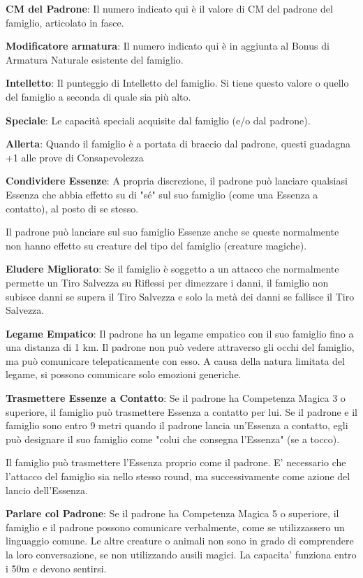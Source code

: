 \documentclass[a4paper,11pt,twoside,openany]{book}
\begin{document}
\bigskip

\textbf{CM del Padrone}: Il numero indicato qui è il valore di CM del padrone del famiglio, articolato in fasce.

\textbf{Modificatore armatura}: Il numero indicato qui è in aggiunta al Bonus di Armatura Naturale esistente del famiglio.

\textbf{Intelletto}: Il punteggio di Intelletto del famiglio. Si tiene questo valore o quello del famiglio a seconda di quale sia più alto.

\textbf{Speciale}: Le capacità speciali acquisite dal famiglio (e/o dal padrone).

\textbf{Allerta}: Quando il famiglio è a portata di braccio dal padrone, questi guadagna +1 alle prove di Consapevolezza

\textbf{Condividere Essenze}: A propria discrezione, il padrone può lanciare qualsiasi Essenza che abbia effetto su di "sé" sul suo famiglio (come una Essenza a contatto), al posto di se stesso.

Il padrone può lanciare sul suo famiglio Essenze anche se queste normalmente non hanno effetto su creature del tipo del famiglio (creature magiche).

\textbf{Eludere Migliorato}: Se il famiglio è soggetto a un attacco che normalmente permette un Tiro Salvezza su Riflessi per dimezzare i danni, il famiglio non subisce danni se supera il Tiro Salvezza e solo la metà dei danni se fallisce il Tiro Salvezza.

\textbf{Legame Empatico}: Il padrone ha un legame empatico con il suo famiglio fino a una distanza di 1 km. Il padrone non può vedere attraverso gli occhi del famiglio, ma può comunicare telepaticamente con esso. A causa della natura limitata del legame, si possono comunicare solo emozioni generiche.

\textbf{Trasmettere Essenze a Contatto}: Se il padrone ha Competenza Magica 3 o superiore, il famiglio può trasmettere Essenza a contatto per lui. Se il padrone e il famiglio sono entro 9 metri quando il padrone lancia un'Essenza a contatto, egli può designare il suo famiglio come "colui che consegna l'Essenza" (se a tocco).

Il famiglio può trasmettere l'Essenza proprio come il padrone. E' necessario che l'attacco del famiglio sia nello stesso round, ma successivamente come azione del lancio dell'Essenza.

\textbf{Parlare col Padrone}: Se il padrone ha Competenza Magica 5 o superiore, il famiglio e il padrone possono comunicare verbalmente, come se utilizzassero un linguaggio comune. Le altre creature o animali non sono in grado di comprendere la loro conversazione, se non utilizzando ausili magici. La capacita' funziona entro i 50m e devono sentirsi.
\end{document}
